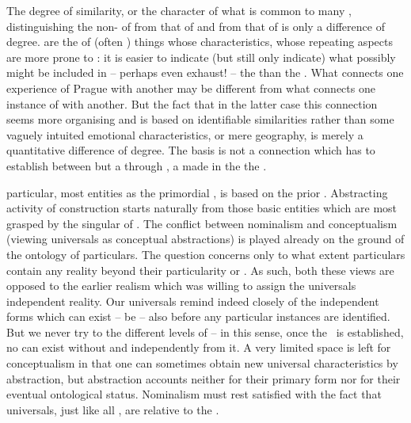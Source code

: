 The degree of similarity, or the character of what is common to many , distinguishing the non- of  from that of
 and from that of  is only a difference of degree.
 are the  of (often ) things whose
characteristics, whose repeating aspects are more prone to :
it is easier to indicate (but still only indicate) what possibly might be
included in -- perhaps even exhaust! -- the   than the
 .  What connects one experience of Prague with another
may be different from what connects one instance of  with another.
But the fact that in the latter case this connection seems more organising and
is based on  identifiable similarities rather than some vaguely
intuited emotional 
characteristics, or mere geography, is merely a quantitative difference of
degree. The basis is not a connection which  has to
establish between  but a  through
  , a  made in the  the \hoa.

\pa {} particular, most  entities as the primordial
, is based on the prior .
Abstracting activity of  construction starts naturally from those
basic entities which are most  grasped by the singular 
of .  The conflict between nominalism and conceptualism (viewing
universals as conceptual abstractions) is played already on the ground of the
ontology of particulars. The question concerns only to what extent particulars
contain any reality beyond their particularity or . As such,
both these views are opposed to the earlier realism which was willing to assign
the universals independent reality. Our universals remind indeed closely of the
independent forms which can exist -- be  -- also before any
particular instances are identified. But we never try to  the
different levels of  -- in this sense, once the \hoa\ is
established, no  can exist without and independently from it.
A very limited space is left for conceptualism in that one can sometimes obtain
new universal characteristics by abstraction, but abstraction accounts neither
for their primary form nor for their eventual ontological status. Nominalism
must rest satisfied with the fact that universals, just like all , are relative to the .



